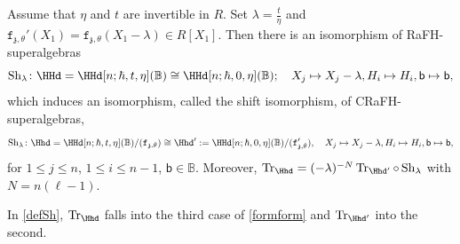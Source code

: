 \documentclass[a4paper,11pt]{amsart}
\newcommand{\Tr}{\op{Tr}}
\numberwithin{equation}{subsection}
\theoremstyle{definition}
\theoremstyle{theorem}
\theoremstyle{remark}
\newcommand\charge{{\mathfrak{z}}}
\newcommand\fct{\mathtt{f}_{\charge,\theta}}
\newcommand\Sh[1][\lambda]{\op{Sh}_{#1}}
\newcommand\bb{\mathsf{b}}
\newcommand\op{\operatorname}
\newcommand\RR{R}
\newcommand{\Bo}{\mathbb{B}}
\begin{document}
 \begin {Theorem}\label{Phidef}
 Assume that $\eta$ and $t$ are invertible in $\RR$. Set $\lambda=\frac{t}{\eta}$ and $\fct'(X_1)=\fct(X_1-\lambda)\in R[X_1]$. Then there is an isomorphism of RaFH-superalgebras
  \begin{equation}\label{defShup}
\Sh\colon\HHd=\HHd[n;\hbar,t,\eta](\Bo)\cong \HHd[n;\hbar,0,\eta](\Bo);
\quad X_j\mapsto X_j-\lambda, H_i\mapsto H_i, \bb\mapsto\bb,
\end{equation}
 which induces an isomorphism, called the shift isomorphism, of CRaFH-superalgebras,
 \begin{equation}\label{defSh}
\Sh\colon\Hhd=\HHd[n;\hbar,t,\eta](\Bo)/(\fct)\cong {\Hhd}':=\HHd[n;\hbar,0,\eta](\Bo)/(\fct'),
\quad X_j\mapsto X_j-\lambda, H_i\mapsto H_i, \bb\mapsto\bb,
\end{equation}
for   $1\leq j\leq n$, $1\leq i\leq n-1$, $\bb\in\Bo$. Moreover,  $\Tr_{\Hhd}=(-\lambda)^{-N}\Tr_{{\Hhd}'}\circ\Sh$ with $N=n(\ell-1)$.
\end{Theorem}
\begin{Remark}In \autoref{defSh}, $\Tr_{\Hhd}$ falls into the third case of \autoref{formform} and $\Tr_{{\Hhd}'}$ into the second.
\end{Remark}
\end{document}
